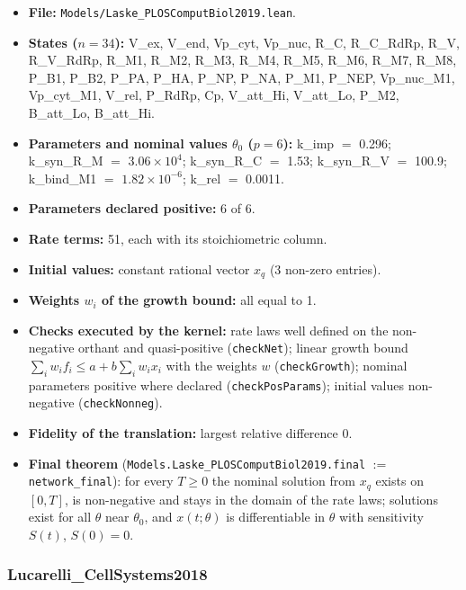 \begin{itemize}\itemsep0pt\small
\item \textbf{File:} \texttt{Models/Laske\_PLOSComputBiol2019.lean}.
\item \textbf{States ($n=34$):} V\_ex, V\_end, Vp\_cyt, Vp\_nuc, R\_C, R\_C\_RdRp, R\_V, R\_V\_RdRp, R\_M1, R\_M2, R\_M3, R\_M4, R\_M5, R\_M6, R\_M7, R\_M8, P\_B1, P\_B2, P\_PA, P\_HA, P\_NP, P\_NA, P\_M1, P\_NEP, Vp\_nuc\_M1, Vp\_cyt\_M1, V\_rel, P\_RdRp, Cp, V\_att\_Hi, V\_att\_Lo, P\_M2, B\_att\_Lo, B\_att\_Hi.
\item \textbf{Parameters and nominal values $\theta_0$ ($p=6$):} k\_imp $=$ 0.296; k\_syn\_R\_M $=$ $3.06\times10^{4}$; k\_syn\_R\_C $=$ 1.53; k\_syn\_R\_V $=$ 100.9; k\_bind\_M1 $=$ $1.82\times10^{-6}$; k\_rel $=$ 0.0011.
\item \textbf{Parameters declared positive:} 6 of 6.
\item \textbf{Rate terms:} 51, each with its stoichiometric column.
\item \textbf{Initial values:} constant rational vector $x_q$ (3 non-zero entries).
\item \textbf{Weights $w_i$ of the growth bound:} all equal to 1.
\item \textbf{Checks executed by the kernel:} rate laws well defined on the non-negative orthant and quasi-positive (\texttt{checkNet}); linear growth bound $\sum_iw_if_i\le a+b\sum_iw_ix_i$ with the weights $w$ (\texttt{checkGrowth}); nominal parameters positive where declared (\texttt{checkPosParams}); initial values non-negative (\texttt{checkNonneg}).
\item \textbf{Fidelity of the translation:} largest relative difference 0.
\item \textbf{Final theorem} (\texttt{Models.Laske\_PLOSComputBiol2019.final} $:=$ \texttt{network\_final}): for every $T\ge0$ the nominal solution from $x_q$ exists on $[0,T]$, is non-negative and stays in the domain of the rate laws; solutions exist for all $\theta$ near $\theta_0$, and $x(t;\theta)$ is differentiable in $\theta$ with sensitivity $S(t)$, $S(0)=0$.
\end{itemize}

\subsubsection*{Lucarelli\_CellSystems2018}

